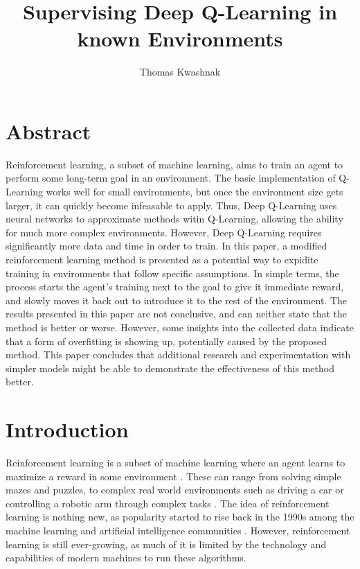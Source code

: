 \documentclass[12pt,letterpaper]{article}
\author{Thomas Kwashnak}
\title{Supervising Deep Q-Learning in known Environments}
\begin{document}
\maketitle

\newpage

\section{Abstract}

Reinforcement learning, a subset of machine learning, aims to train an agent to perform some long-term goal in an environment.
The basic implementation of Q-Learning works well for small environments, but once the environment size gets larger, it can quickly become infeasable to apply.
Thus, Deep Q-Learning uses neural networks to approximate methods witin Q-Learning, allowing the ability for much more complex environments.
However, Deep Q-Learning requires significantly more data and time in order to train.
In this paper, a modified reinforcement learning method is presented as a potential way to expidite training in environments that follow specific assumptions.
In simple terms, the process starts the agent's training next to the goal to give it immediate reward, and slowly moves it back out to introduce it to the rest of the environment.
The results presented in this paper are not conclusive, and can neither state that the method is better or worse.
However, some insights into the collected data indicate that a form of overfitting is showing up, potentially caused by the proposed method.
This paper concludes that additional research and experimentation with simpler models might be able to demonstrate the effectiveness of this method better.

\section{Introduction}

Reinforcement learning is a subset of machine learning where an agent learns to maximize a reward in some environment \cite{article_reinforcement_learning_survey}.
These can range from solving simple mazes and puzzles, to complex real world environments such as driving a car or controlling a robotic arm through complex tasks \cite{article_deep_learning_hybrid_quantum}.
The idea of reinforcement learning is nothing new, as popularity started to rise back in the 1990s among the machine learning and artificial intelligence communities \cite{article_reinforcement_learning_survey}.
However, reinforcement learning is still ever-growing, as much of it is limited by the technology and capabilities of modern machines to run these algorithms.
\end{document}
